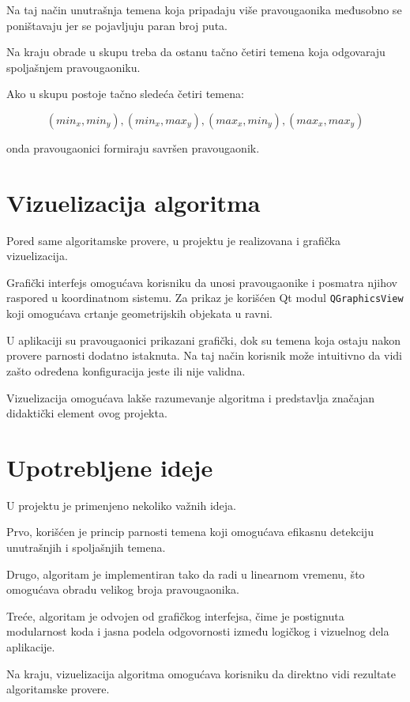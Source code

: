 \documentclass[11pt,a4paper]{article}
\begin{document}
Na taj način unutrašnja temena koja pripadaju više pravougaonika međusobno se poništavaju jer se pojavljuju paran broj puta.

Na kraju obrade u skupu treba da ostanu tačno četiri temena koja odgovaraju spoljašnjem pravougaoniku.

Ako u skupu postoje tačno sledeća četiri temena:

\[
(min_x, min_y), (min_x, max_y), (max_x, min_y), (max_x, max_y)
\]

onda pravougaonici formiraju savršen pravougaonik.

\section{Vizuelizacija algoritma}

Pored same algoritamske provere, u projektu je realizovana i grafička vizuelizacija.

Grafički interfejs omogućava korisniku da unosi pravougaonike i posmatra njihov raspored u koordinatnom sistemu. 
Za prikaz je korišćen Qt modul \texttt{QGraphicsView} koji omogućava crtanje geometrijskih objekata u ravni.

U aplikaciji su pravougaonici prikazani grafički, dok su temena koja ostaju nakon provere parnosti dodatno istaknuta. 
Na taj način korisnik može intuitivno da vidi zašto određena konfiguracija jeste ili nije validna.

Vizuelizacija omogućava lakše razumevanje algoritma i predstavlja značajan didaktički element ovog projekta.

\section{Upotrebljene ideje}

U projektu je primenjeno nekoliko važnih ideja.

Prvo, korišćen je princip parnosti temena koji omogućava efikasnu detekciju unutrašnjih i spoljašnjih temena.

Drugo, algoritam je implementiran tako da radi u linearnom vremenu, što omogućava obradu velikog broja pravougaonika.

Treće, algoritam je odvojen od grafičkog interfejsa, čime je postignuta modularnost koda i jasna podela odgovornosti između logičkog i vizuelnog dela aplikacije.

Na kraju, vizuelizacija algoritma omogućava korisniku da direktno vidi rezultate algoritamske provere.
\end{document}
